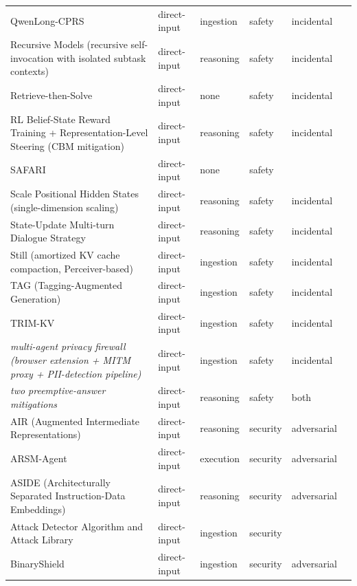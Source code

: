 \begin{longtable}{@{}p{}lllll@{}}
QwenLong-CPRS & direct-input & ingestion & safety & incidental & \cite{shen-2025-qwenlongcprs} \\
Recursive Models (recursive self-invocation with isolated subtask contexts) & direct-input & reasoning & safety & incidental & \cite{yang-2026-recursive} \\
Retrieve-then-Solve & direct-input & none & safety & incidental & \cite{du-2025-context} \\
RL Belief-State Reward Training + Representation-Level Steering (CBM mitigation) & direct-input & reasoning & safety & incidental & \cite{xu-2026-should} \\
SAFARI & direct-input & none & safety &  & \cite{zhu-2026-safari} \\
Scale Positional Hidden States (single-dimension scaling) & direct-input & reasoning & safety & incidental & \cite{yu-2024-mitigate} \\
State-Update Multi-turn Dialogue Strategy & direct-input & reasoning & safety & incidental & \cite{liu-2025-stateupdate} \\
Still (amortized KV cache compaction, Perceiver-based) & direct-input & ingestion & safety & incidental & \cite{oneill-2026-still} \\
TAG (Tagging-Augmented Generation) & direct-input & ingestion & safety & incidental & \cite{pal-2025-taggingaugmented} \\
TRIM-KV & direct-input & ingestion & safety & incidental & \cite{bui-2025-cache} \\
\emph{multi-agent privacy firewall (browser extension + MITM proxy + PII-detection pipeline)} & direct-input & ingestion & safety & incidental & \cite{cuesta-2026-multiagent} \\
\emph{two preemptive-answer mitigations} & direct-input & reasoning & safety & both & \cite{xu-2024-preemptive} \\
AIR (Augmented Intermediate Representations) & direct-input & reasoning & security & adversarial & \cite{kariyappa-2025-stronger} \\
ARSM-Agent & direct-input & execution & security & adversarial & \cite{hu-2026-research} \\
ASIDE (Architecturally Separated Instruction-Data Embeddings) & direct-input & reasoning & security & adversarial & \cite{zverev-2025-aside} \\
Attack Detector Algorithm and Attack Library & direct-input & ingestion & security &  & \cite{alla-2025-cyberattacks} \\
BinaryShield & direct-input & ingestion & security & adversarial & \cite{gill-2025-binaryshield} \\

\end{longtable}
